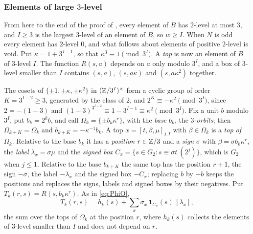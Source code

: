 \subsubsection*{Elements of large \texorpdfstring{$3$}{3}-level}
From here to the end of the proof of , every element
of $B$ has $2$-level at most $3$, and $I\ge3$ is the largest $3$-level of an
element of $B$, so $w\ge I$. When $N$ is odd every element has $2$-level $0$,
and what follows about elements of positive $2$-level is void. Put
$\kappa=1+3^{I-1}$, so that $\kappa^{3}\equiv1\pmod{3^{I}}$. A \emph{top} is
now an element of $B$ of $3$-level $I$. The function $R(s,a)$ depends on $a$
only modulo $3^{I}$, and a box of $3$-level smaller than $I$ contains
$(s,a)$, $(s,a\kappa)$ and $(s,a\kappa^{2})$ together.

The cosets of $\{\pm1,\pm\kappa,\pm\kappa^{2}\}$ in $(\mathbb{Z}/3^{I})^{\times}$
form a cyclic group of order $K=3^{I-2}\ge3$, generated by the class of $2$,
and $2^{K}\equiv-\kappa^{2}\pmod{3^{I}}$, since $2=-(1-3)$ and
$(1-3)^{3^{I-2}}\equiv1-3^{I-1}\equiv\kappa^{2}\pmod{3^{I}}$. Fix a unit
$b$ modulo $3^{I}$, put $b_{k}=2^{k}b$, and call
$\Omega_{k}=\{\pm b_{k}\kappa^{r}\}$, with the \emph{base} $b_{k}$, the
\emph{$3$-orbits}; then $\Omega_{k+K}=\Omega_{k}$ and $b_{k+K}=-\kappa^{-1}
b_{k}$. A top $x=[t,\beta,\mu]_{j,I}$ with $\beta\in\Omega_{k}$ is a
\emph{top of $\Omega_{k}$}. Relative to the base $b_{k}$ it has a
\emph{position} $r\in\mathbb{Z}/3$ and a \emph{sign} $\sigma$ with
$\beta=\sigma b_{k}\kappa^{r}$, the \emph{label} $\lambda_{x}=\sigma\mu$ and
the \emph{signed box} $C_{x}=\{s\in G_{2}:s\equiv\sigma t\ (2^{j})\}$, which
is $G_{2}$ when $j\le1$. Relative to the base $b_{k+K}$ the same top has the
position $r+1$, the sign $-\sigma$, the label $-\lambda_{x}$ and the signed
box $-C_{x}$; replacing $b$ by $-b$ keeps the positions and replaces the
signs, labels and signed boxes by their negatives. Put
$T_{k}(r,s)=R(s,b_{k}\kappa^{r})$. As in \eqref{eq:PhiO},
\begin{equation}\label{eq:Tk}
  T_{k}(r,s)=h_{k}(s)+\sum_{x}\sigma_{x}\,\mathbf 1_{C_{x}}(s)\,[\lambda_{x}],
\end{equation}
the sum over the tops of $\Omega_{k}$ at the position $r$, where $h_{k}(s)$
collects the elements of $3$-level smaller than $I$ and does not depend on
$r$.

